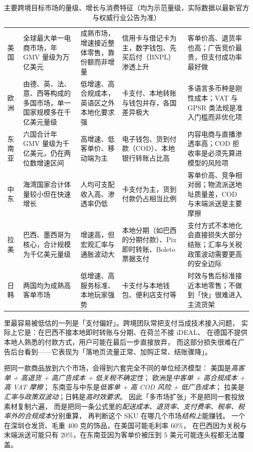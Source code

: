 \begin{table}[htbp]
\centering
\caption{主要跨境目标市场的量级、增长与消费特征（均为示范量级，实际数据以最新官方与权威行业公告为准）}
\label{tab:cbec-markets}
\small
\begin{tabularx}{\textwidth}{L{1.7cm} L{2.3cm} L{2.1cm} L{2.4cm} Y}
\toprule
{} &  &  &  &  \\
\midrule
美国 & 全球最大单一电商市场，年 GMV 量级为万亿美元 & 成熟市场，增速接近整体零售，靠份额而非增量 & 信用卡与借记卡为主，数字钱包、先买后付（BNPL）渗透上升 & 客单价高、退货率也高；广告竞价最贵，但支付成功率最好做 \\
\addlinespace
欧洲 & 由德、英、法、意、西等构成的多国市场，单一国家规模多在千亿美元量级 & 低增速、高合规成本，英语区之外本地化要求强 & 卡支付、本地转账与钱包并存，各国差异极大 & 多语言多币种是刚性成本；VAT 与 GPSR 类法规是准入门槛而非优化项 \\
\addlinespace
东南亚 & 六国合计年 GMV 量级为千亿美元，仍在两位数增速区间 & 高增速、低客单价、移动端为主 & 电子钱包、货到付款（COD）、本地银行转账占比高 & 内容电商与直播渗透率高；COD 拒收率是必须先算进模型的风险项 \\
\addlinespace
中东 & 海湾国家合计体量较小但在快速增长 & 人均可支配收入高、渗透率仍低 & 卡支付为主，货到付款仍占相当比例 & 客单价高、竞争相对弱；物流派送地址质量差，COD 与末端派送是主要摩擦 \\
\addlinespace
拉美 & 巴西、墨西哥为核心，合计规模为千亿美元量级 & 增速高，但宏观汇率与通胀波动大 & 本地分期（如巴西的分期付款）、Pix 即时转账、Boleto 票据支付 & 支付方式不本地化会直接损失大部分结账；汇率与关税政策波动需要更高的安全边际 \\
\addlinespace
日韩 & 两国均为成熟高客单市场 & 低增速、高服务标准、本地玩家强势 & 卡支付与本地钱包、便利店支付等 & 时效与售后标准接近本地零售；不做到「快」很难进入主流货架 \\
\bottomrule
\end{tabularx}
\end{table}

 里最容易被低估的一列是「支付偏好」。跨境团队常把支付当成技术接入问题，
实际上它是：在巴西不接本地即时转账与分期、在荷兰不接 iDEAL、
在德国不提供本地人熟悉的付款方式，用户可能在最后一步直接放弃，
而这部分损失很难在广告后台看到——它表现为「落地页流量正常、加购正常、结账骤降」。

\begin{insight}
把同一款商品放到六个市场，会得到六套完全不同的单位经济模型：
美国是\emph{高客单 + 高退货 + 高广告成本 + 低关税不确定性}；
欧洲是\emph{中客单 + 高合规成本 + 高 VAT 摩擦}；
东南亚与中东是\emph{低客单 + 高 COD 风险 + 低广告成本}；
拉美是\emph{汇率与政策双波动}；日韩是\emph{高时效要求}。
因此「多市场扩张」不是把同一套投放素材复制六遍，
而是把同一条公式里的\emph{配送成本、退货率、支付费率、税率、税率外的合规成本}分别重算，
再判断这个 SKU 在哪几个市场\emph{结构上}能赚钱。
一个在深圳仓发货、毛重 400 克的饰品，在美国可能毛利率 60\%，
在巴西因为关税与末端派送可能只有 20\%，在东南亚因为客单价被压到 5 美元可能连头程都无法覆盖。
\end{insight}

